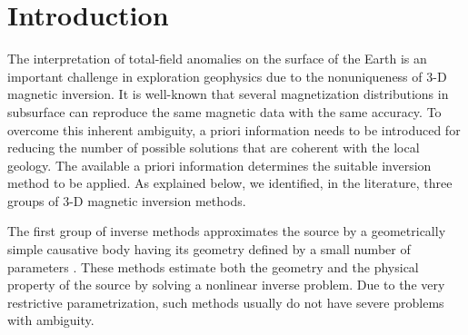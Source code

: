 \section{Introduction}

The interpretation of total-field anomalies on the surface of the Earth is an 
important challenge in exploration geophysics due to the nonuniqueness of 3-D magnetic 
inversion. It is well-known that several magnetization distributions in subsurface 
can reproduce the same magnetic data with the same accuracy. 
To overcome this inherent ambiguity, a priori information needs to be introduced 
for reducing the number of possible solutions that are coherent with the local geology.
The available a priori information determines the suitable inversion method to be applied. 
As explained below, we identified, in the literature, three groups of 3-D magnetic inversion methods.

The first group of inverse methods approximates the source by a geometrically 
simple causative body having its geometry defined by a small number of parameters 
\cite[e.g., ][]{ballantyne-1980,bhattacharyya-1980,silva-1983,medeiros_silva1995}. These methods 
estimate both the geometry and the physical property of the source by solving 
a nonlinear inverse problem. Due to the very restrictive parametrization, 
such methods usually do not have severe problems with ambiguity.

